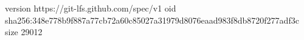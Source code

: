 version https://git-lfs.github.com/spec/v1
oid sha256:348e778b9f887a77cb72a60c85027a31979d8076eaad983f8db8720f277adf3c
size 29012
